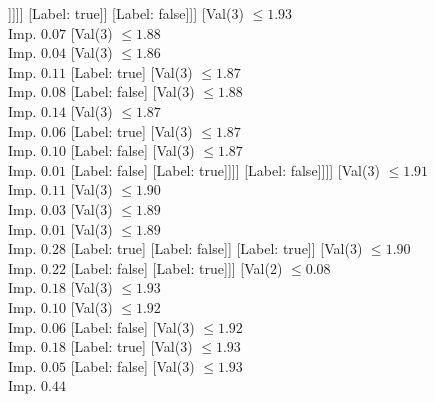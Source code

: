 \documentclass[margin=10pt]{standalone}
\begin{document}
\begin{forest}
										[Val($3$) $ \leq 1.82$ \\ Imp. $0.00$
											[Label: false]
											[Val($3$) $ \leq 1.82$ \\ Imp. $0.07$
												[Label: true]
												[Val($3$) $ \leq 1.83$ \\ Imp. $0.01$
													[Label: false]
													[Val($3$) $ \leq 1.83$ \\ Imp. $0.22$
														[Label: true]
														[Label: false]]]]]
										[Label: true]]
									[Label: false]]]
							[Val($3$) $ \leq 1.93$ \\ Imp. $0.07$
								[Val($3$) $ \leq 1.88$ \\ Imp. $0.04$
									[Val($3$) $ \leq 1.86$ \\ Imp. $0.11$
										[Label: true]
										[Val($3$) $ \leq 1.87$ \\ Imp. $0.08$
											[Label: false]
											[Val($3$) $ \leq 1.88$ \\ Imp. $0.14$
												[Val($3$) $ \leq 1.87$ \\ Imp. $0.06$
													[Label: true]
													[Val($3$) $ \leq 1.87$ \\ Imp. $0.10$
														[Label: false]
														[Val($3$) $ \leq 1.87$ \\ Imp. $0.01$
															[Label: false]
															[Label: true]]]]
												[Label: false]]]]
									[Val($3$) $ \leq 1.91$ \\ Imp. $0.11$
										[Val($3$) $ \leq 1.90$ \\ Imp. $0.03$
											[Val($3$) $ \leq 1.89$ \\ Imp. $0.01$
												[Val($3$) $ \leq 1.89$ \\ Imp. $0.28$
													[Label: true]
													[Label: false]]
												[Label: true]]
											[Val($3$) $ \leq 1.90$ \\ Imp. $0.22$
												[Label: false]
												[Label: true]]]
										[Val($2$) $ \leq 0.08$ \\ Imp. $0.18$
											[Val($3$) $ \leq 1.93$ \\ Imp. $0.10$
												[Val($3$) $ \leq 1.92$ \\ Imp. $0.06$
													[Label: false]
													[Val($3$) $ \leq 1.92$ \\ Imp. $0.18$
														[Label: true]
														[Val($3$) $ \leq 1.93$ \\ Imp. $0.05$
															[Label: false]
															[Val($3$) $ \leq 1.93$ \\ Imp. $0.44$

\end{forest}
\end{document}
